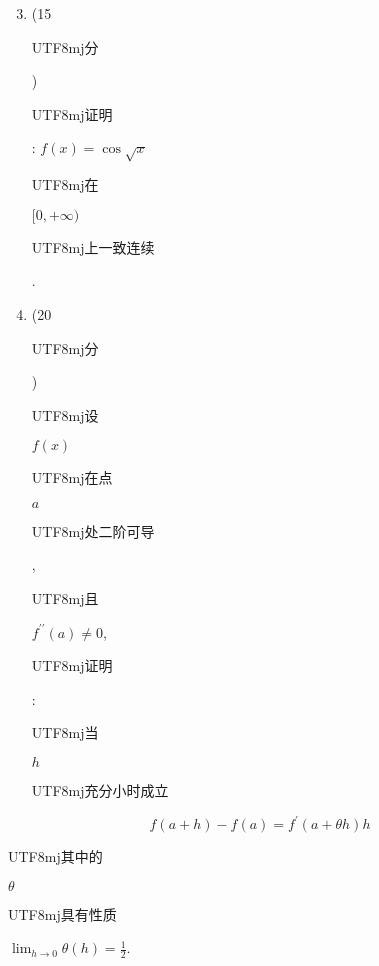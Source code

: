 \documentclass[10pt]{article}
\begin{document}
\begin{enumerate}
  \setcounter{enumi}{2}
  \item (15 \begin{CJK}{UTF8}{mj}分\end{CJK}) \begin{CJK}{UTF8}{mj}证明\end{CJK}: $f(x)=\cos \sqrt{x}$ \begin{CJK}{UTF8}{mj}在\end{CJK} $[0,+\infty)$ \begin{CJK}{UTF8}{mj}上一致连续\end{CJK}.

  \item (20 \begin{CJK}{UTF8}{mj}分\end{CJK}) \begin{CJK}{UTF8}{mj}设\end{CJK} $f(x)$ \begin{CJK}{UTF8}{mj}在点\end{CJK} $a$ \begin{CJK}{UTF8}{mj}处二阶可导\end{CJK}, \begin{CJK}{UTF8}{mj}且\end{CJK} $f^{\prime \prime}(a) \neq 0$, \begin{CJK}{UTF8}{mj}证明\end{CJK}: \begin{CJK}{UTF8}{mj}当\end{CJK} $h$ \begin{CJK}{UTF8}{mj}充分小时成立\end{CJK}

\end{enumerate}
$$
f(a+h)-f(a)=f^{\prime}(a+\theta h) h
$$
\begin{CJK}{UTF8}{mj}其中的\end{CJK} $\theta$ \begin{CJK}{UTF8}{mj}具有性质\end{CJK} $\lim _{h \rightarrow 0} \theta(h)=\frac{1}{2}$.
\end{document}
